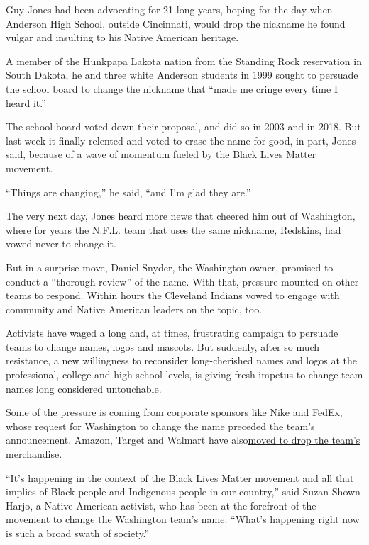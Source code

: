 Guy Jones had been advocating for 21 long years, hoping for the day when
Anderson High School, outside Cincinnati, would drop the nickname he
found vulgar and insulting to his Native American heritage.

A member of the Hunkpapa Lakota nation from the Standing Rock
reservation in South Dakota, he and three white Anderson students in
1999 sought to persuade the school board to change the nickname that
``made me cringe every time I heard it.''

The school board voted down their proposal, and did so in 2003 and in
2018. But last week it finally relented and voted to erase the name for
good, in part, Jones said, because of a wave of momentum fueled by the
Black Lives Matter movement.

``Things are changing,'' he said, ``and I'm glad they are.''

The very next day, Jones heard more news that cheered him out of
Washington, where for years the
\href{https://www.nytimes.com/2020/07/13/sports/football/washington-redskins-new-name.html}{N.F.L.
team that uses the same nickname, Redskins}, had vowed never to change
it.

But in a surprise move, Daniel Snyder, the Washington owner, promised to
conduct a ``thorough review'' of the name. With that, pressure mounted
on other teams to respond. Within hours the Cleveland Indians vowed to
engage with community and Native American leaders on the topic, too.

Activists have waged a long and, at times, frustrating campaign to
persuade teams to change names, logos and mascots. But suddenly, after
so much resistance, a new willingness to reconsider long-cherished names
and logos at the professional, college and high school levels, is giving
fresh impetus to change team names long considered untouchable.

Some of the pressure is coming from corporate sponsors like Nike and
FedEx, whose request for Washington to change the name preceded the
team's announcement. Amazon, Target and Walmart have
also\href{https://www.nytimes.com/2020/07/06/sports/football/washington-team-name-change.html}{moved
to drop the team's merchandise}.

``It's happening in the context of the Black Lives Matter movement and
all that implies of Black people and Indigenous people in our country,''
said Suzan Shown Harjo, a Native American activist, who has been at the
forefront of the movement to change the Washington team's name. ``What's
happening right now is such a broad swath of society.''

